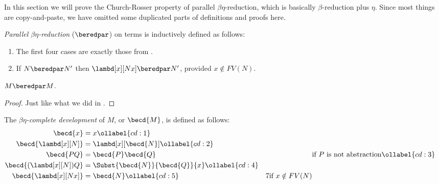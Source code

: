 \documentclass[../../../include/open-logic-section]{subfiles}
\begin{document}


In this section we will prove the Church-Rosser property of parallel
$\beta\eta$-reduction, which is basically $\beta$-reduction plus
$\eta$. Since most things are copy-and-paste, we have omitted some
duplicated parts of definitions and proofs here.

\begin{defn} 
  \emph{Parallel $\beta\eta$-reduction} ($\beredpar$) on terms is inductively defined as follows:
  \begin{enumerate}
    \item The first four cases are exactly those from .
    \item {} If $N \beredpar N'$ then $\lambd[x][Nx]
      \beredpar N'$, provided $x \notin FV(N)$.
  \end{enumerate}
\end{defn}

\begin{thm}
  $M \beredpar M$.
\end{thm}
\begin{proof}
  Just like what we did in .
\end{proof}

\begin{defn}
  The \emph{$\beta\eta$-complete development} of $M$, or $\becd{M}$, is defined
  as follows:
  \begin{align}
    \becd{x} &= x \ollabel{cd:1} \\
    \becd{\lambd[x][N]} &= \lambd[x][\becd{N}] \ollabel{cd:2}\\
    \becd{PQ} &= \becd{P}\becd{Q} && \text{if $P$ is not abstraction} \ollabel{cd:3} \\
    \becd{(\lambd[x][N])Q} &= \Subst{\becd{N}}{\becd{Q}}{x}
                             \ollabel{cd:4} \\
    \becd{\lambd[x][Nx]} &= \becd{N} \ollabel{cd:5} &7 \text{if $x
                                                      \notin FV(N)$}
  \end{align}
\end{defn}
\end{document}
